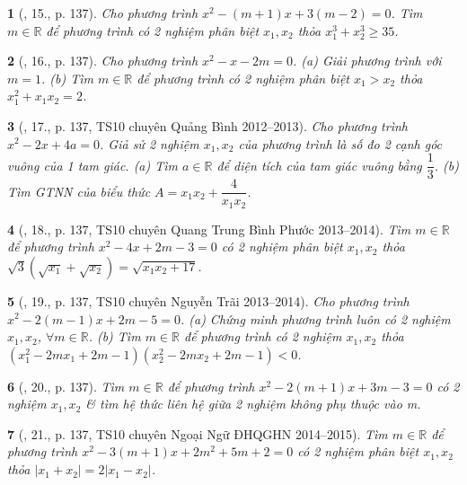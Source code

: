 \documentclass{article}
\newtheorem{baitoan}{}
\begin{document}
\begin{baitoan}[\cite{Thu_Viet_Minh_ptb2}, 15., p. 137]
	Cho phương trình $x^2 - (m + 1)x + 3(m - 2) = 0$. Tìm $m\in\mathbb{R}$ để phương trình có 2 nghiệm phân biệt $x_1,x_2$ thỏa $x_1^3 + x_2^3\ge35$.
\end{baitoan}

\begin{baitoan}[\cite{Thu_Viet_Minh_ptb2}, 16., p. 137]
	Cho phương trình $x^2 - x - 2m = 0$. (a) Giải phương trình với $m = 1$. (b) Tìm $m\in\mathbb{R}$ để phương trình có 2 nghiệm phân biệt $x_1 > x_2$ thỏa $x_1^2 + x_1x_2 = 2$.
\end{baitoan}

\begin{baitoan}[\cite{Thu_Viet_Minh_ptb2}, 17., p. 137, TS10 chuyên Quảng Bình 2012--2013]
	Cho phương trình $x^2 - 2x + 4a = 0$. Giả sử 2 nghiệm $x_1,x_2$ của phương trình là số đo 2 cạnh góc vuông của 1 tam giác. (a) Tìm $a\in\mathbb{R}$ để diện tích của tam giác vuông bằng $\dfrac{1}{3}$. (b) Tìm {\rm GTNN} của biểu thức $A = x_1x_2 + \dfrac{4}{x_1x_2}$.
\end{baitoan}

\begin{baitoan}[\cite{Thu_Viet_Minh_ptb2}, 18., p. 137, TS10 chuyên Quang Trung Bình Phước 2013--2014]
	Tìm $m\in\mathbb{R}$ để phương trình $x^2 - 4x + 2m - 3 = 0$ có 2 nghiệm phân biệt $x_1,x_2$ thỏa $\sqrt{3}(\sqrt{x_1} + \sqrt{x_2}) = \sqrt{x_1x_2 + 17}$.
\end{baitoan}

\begin{baitoan}[\cite{Thu_Viet_Minh_ptb2}, 19., p. 137, TS10 chuyên Nguyễn Trãi 2013--2014]
	Cho phương trình $x^2 - 2(m - 1)x + 2m - 5 = 0$. (a) Chứng minh phương trình luôn có 2 nghiệm $x_1,x_2$, $\forall m\in\mathbb{R}$. (b) Tìm $m\in\mathbb{R}$ để phương trình có 2 nghiệm $x_1,x_2$ thỏa $(x_1^2 - 2mx_1 + 2m - 1)(x_2^2 - 2mx_2 + 2m - 1) < 0$.
\end{baitoan}

\begin{baitoan}[\cite{Thu_Viet_Minh_ptb2}, 20., p. 137]
	Tìm $m\in\mathbb{R}$ để phương trình $x^2 - 2(m + 1)x + 3m - 3 = 0$ có 2 nghiệm $x_1,x_2$ \& tìm hệ thức liên hệ giữa 2 nghiệm không phụ thuộc vào m.
\end{baitoan}

\begin{baitoan}[\cite{Thu_Viet_Minh_ptb2}, 21., p. 137, TS10 chuyên Ngoại Ngữ ĐHQGHN 2014--2015]
	Tìm $m\in\mathbb{R}$ để phương trình $x^2 - 3(m + 1)x + 2m^2 + 5m + 2 = 0$ có 2 nghiệm phân biệt $x_1,x_2$ thỏa $|x_1 + x_2| = 2|x_1 - x_2|$.
\end{baitoan}
\end{document}
